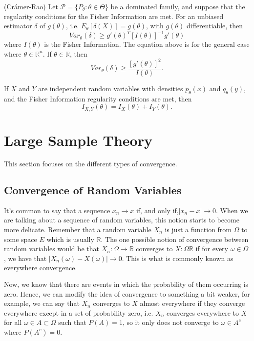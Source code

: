 \begin{theorem}(Crámer-Rao)
	Let $\mathcal P=\{P_\theta: \theta \in \Theta\}$ be a dominated family, and suppose that the
	regularity conditions for the Fisher Information are met. For an unbiased
	estimator $\delta$ of $g(\theta)$, i.e. $E_\theta[\delta(X)] = g(\theta)$, with
	$g(\theta)$ differentiable, then
	\begin{equation}
		Var_\theta(\delta) \geq
		g'(\theta)^T
		[I(\theta)]^{-1}
		g'(\theta)
	\end{equation}
	where $I(\theta)$ is the Fisher Information. The equation above is for the general case
	where $\theta \in \mathbb R^n$. If $\theta \in \mathbb R$, then
	\begin{equation}
		Var_\theta(\delta) \geq
		\frac{[g'(\theta)]^2}{I(\theta)}.
	\end{equation}
\end{theorem}

\begin{corollary}
	If $X$ and $Y$ are independent random variables with densities $p_\theta(x)$ and $q_\theta(y)$, and the
	Fisher Information regularity conditions are met, then
	\begin{equation}
		I_{X,Y}(\theta) = I_X(\theta) + I_Y(\theta).
	\end{equation}
\end{corollary}

\section{Large Sample Theory}
This section focuses on the different types of convergence.

\subsection{Convergence of Random Variables}

It's common to say that a sequence $x_n \to x$ if, and only if,$|x_n - x|\to 0$.
When we are talking about a sequence of random variables, this notion starts to become more delicate.
Remember that a random variable $X_n$ is just a function from $\Omega$ to some space $E$ which is
usually $\mathbb R$. The one possible notion of convergence between random variables
would be that $X_n:\Omega \to \mathbb R$ converges to $X:\Omega \mathbb R$
if for every $\omega \in \Omega$, we have that $|X_n(\omega)-X(\omega)| \to 0$. This is what
is commonly known as everywhere convergence.

Now, we know that there are events in which the probability of them occurring is zero. Hence,
we can modify the idea of convergence to something a bit weaker, for example,
we can say that $X_n$ converges to $X$ almost everywhere if they converge everywhere
except in a set of probability zero, i.e. $X_n$ converges everywhere to $X$ for all
$\omega \in A \subset \Omega$ such that $P(A)=1$, so it only does not converge to $\omega \in A^c$
where $P(A^c) = 0$.


